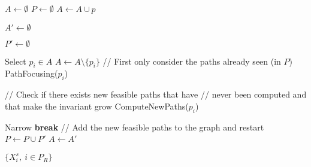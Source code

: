 \STATE $A \gets \emptyset$
\STATE $P \gets \emptyset$
	\STATE $A \gets A \cup p$
\ENDFOR

\STATE $A' \gets \emptyset$

\STATE $P' \gets \emptyset$

	\STATE Select $p_i \in A$
	\STATE $A \gets A \setminus \{p_i\}$
	\STATE // First only consider the paths already seen (in $P$)
	\STATE PathFocusing($p_i$)
	
	\STATE // Check if there exists new feasible paths that have 
	\STATE // never been computed and that make the invariant grow
	\STATE ComputeNewPaths($p_i$)

\ENDWHILE
\STATE Narrow
	\STATE \textbf{break}
\ENDIF
\STATE // Add the new feasible paths to the graph and restart 
\STATE $P \gets P \cup P'$
\STATE $A \gets A'$
\ENDWHILE

\STATE \RETURN $\{X_i^s,\ i \in P_R\}$

